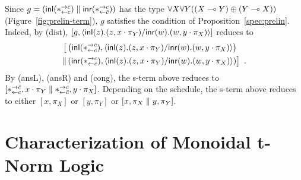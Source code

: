 \begin{example}
 \label{spec-ex}
 Since $g = (\mathsf{inl}({\ast^{\rightarrow {\bar{c}}}_{\leftarrow{c}}})\parallel\mathsf{inr}({\ast^{\rightarrow {c}}_{\leftarrow{\bar{c}}}}))$ has the type
 $\forall X\forall Y((X\multimap Y)\oplus (Y\multimap X))$ (Figure~\ref{fig:prelin-term}),
 $g$ satisfies the condition of Proposition~\ref{spec:prelin}.
 Indeed, by (dist),
 $\left[g, \langle \mathsf{inl}({z}). ({z},{x\cdot\pi_Y})/ \mathsf{inr}({w}). ({w},{y\cdot\pi_X})\rangle\right]$
 reduces to
 \begin{align*}
  \bigl[& \left(\mathsf{inl}({\ast^{\rightarrow {\bar{c}}}_{\leftarrow{c}}}),
  \langle \mathsf{inl}({z}). ({z},{x\cdot\pi_Y})/ \mathsf{inr}({w}). ({w},{y\cdot\pi_X})\rangle\right) \\ \parallel
  & \left(\mathsf{inr}({\ast^{\rightarrow {c}}_{\leftarrow{\bar{c}}}}), \langle \mathsf{inl}({z}). ({z},{x\cdot\pi_Y})/ \mathsf{inr}({w}). ({w},{y\cdot\pi_X})\rangle\right)\bigr]\enspace.
 \end{align*}
 By (ansL), (ansR) and (cong), the s-term above reduces to
 $[\ast^{\rightarrow {\bar{c}}}_{\leftarrow{c}}, x\cdot\pi_Y\parallel \ast^{\rightarrow {c}}_{\leftarrow{\bar{c}}},y\cdot\pi_X]$.
 Depending on the schedule,  the s-term above reduces to either
 $[x,\pi_X]$ or $[y,\pi_Y]$ or $[x,\pi_X\parallel y,\pi_Y]$.
\end{example}






\section{Characterization of Monoidal t-Norm Logic}
\label{sec:as-logic}

